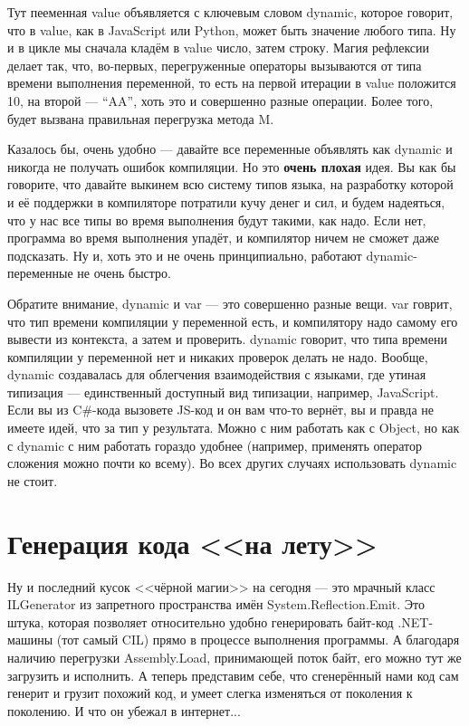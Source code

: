 \documentclass[a5paper]{article}
\begin{document}
Тут пееменная value объявляется с ключевым словом dynamic, которое говорит, что в value, как в JavaScript или Python, может быть значение любого типа. Ну и в цикле мы сначала кладём в value число, затем строку. Магия рефлексии делает так, что, во-первых, перегруженные операторы вызываются от типа времени выполнения переменной, то есть на первой итерации в value положится 10, на второй --- ``AA'', хоть это и совершенно разные операции. Более того, будет вызвана правильная перегрузка метода M.

Казалось бы, очень удобно --- давайте все переменные объявлять как dynamic и никогда не получать ошибок компиляции. Но это \textbf{очень плохая} идея. Вы как бы говорите, что давайте выкинем всю систему типов языка, на разработку которой и её поддержки в компиляторе потратили кучу денег и сил, и будем надеяться, что у нас все типы во время выполнения будут такими, как надо. Если нет, программа во время выполнения упадёт, и компилятор ничем не сможет даже подсказать. Ну и, хоть это и не очень принципиально, работают dynamic-переменные не очень быстро.

Обратите внимание, dynamic и var --- это совершенно разные вещи. var говрит, что тип времени компиляции у переменной есть, и компилятору надо самому его вывести из контекста, а затем и проверить. dynamic говорит, что типа времени компиляции у переменной нет и никаких проверок делать не надо. Вообще, dynamic создавалась для облегчения взаимодействия с языками, где утиная типизация --- единственный доступный вид типизации, например, JavaScript. Если вы из C\#-кода вызовете JS-код и он вам что-то вернёт, вы и правда не имеете идей, что за тип у результата. Можно с ним работать как с Object, но как с dynamic с ним работать гораздо удобнее (например, применять оператор сложения можно почти ко всему). Во всех других случаях использовать dynamic не стоит.

\section{Генерация кода <<на лету>>}

Ну и последний кусок <<чёрной магии>> на сегодня --- это мрачный класс ILGenerator из запретного пространства имён System.Reflection.Emit. Это штука, которая позволяет относительно удобно генерировать байт-код .NET-машины (тот самый CIL) прямо в процессе выполнения программы. А благодаря наличию перегрузки Assembly.Load, принимающей поток байт, его можно тут же загрузить и исполнить. А теперь представим себе, что сгенерённый нами код сам генерит и грузит похожий код, и умеет слегка изменяться от поколения к поколению. И что он убежал в интернет...
\end{document}
